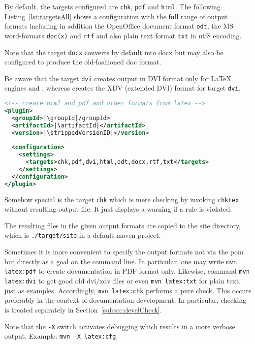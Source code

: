 By default, the targets configured are \texttt{chk}, \texttt{pdf} and \texttt{html}. 
The following Listing~\ref{lst:targetsAll} shows a configuration 
with the full range of output formats including in addition 
the OpenOffice document format \texttt{odt}, 
the MS word-formats \texttt{doc(x)} and \texttt{rtf} %
and also plain text format \texttt{txt} in utf8 encoding. 

Note that the target \texttt{docx} converts by default into \gls{docx} 
but may also be configured to produce the old-fashioned \gls{doc} format. 

Be aware that the target \texttt{dvi} creates output in DVI format 
only for \LaTeX{} engines \lualatex{} and \pdflatex{}, 
whereas \xelatex{} creates the XDV (extended DVI) format for target \texttt{dvi}. 

\begin{lstlisting}[language=xml, basicstyle=\small,
escapechar=|,
float, captionpos=b, label={lst:targetsAll}, 
caption={Configuration with full range output formats}]
<!-- create html and pdf and other formats from latex -->
<plugin>
  <groupId>|\groupId|/groupId>
  <artifactId>|\artifactId|</artifactId>
  <version>|\strippedVersionID|</version>
	
  <configuration>
    <settings>
      <targets>chk,pdf,dvi,html,odt,docx,rtf,txt</targets>
    </settings>
  </configuration>
</plugin>
\end{lstlisting}

Somehow special is the target \texttt{chk} 
which is mere checking by invoking \texttt{chktex} 
without resulting output file. 
It just displays a warning if a rule is violated. 

The resulting files in the given output formats 
are copied to the site directory, 
which is \texttt{./target/site} in a default maven project. 

Sometimes it is more convenient 
to specify the output formats not via the pom 
but directly as a goal on the command line. 
In particular, one may write \texttt{mvn latex:pdf} to create documentation 
in PDF-format only.
Likewise, command \texttt{mvn latex:dvi} to get good old dvi/xdv files
or even \texttt{mvn latex:txt} for plain text, just as examples. 
Accordingly, \texttt{mvn latex:chk} performs a pure check. 
This occurs preferably in the context of documentation development. 
In particular, checking is treated separately in Section~\ref{subsec:develCheck}. 

Note that the \texttt{-X} switch activates debugging 
which results in a more verbose output. 
Example: \texttt{mvn -X latex:cfg}. 

